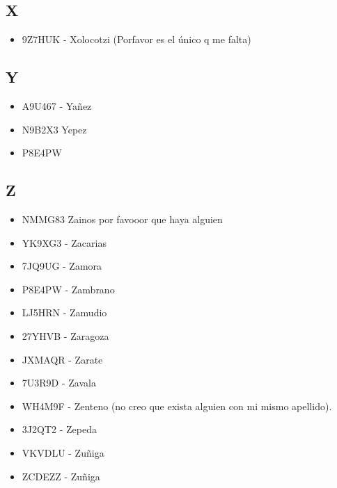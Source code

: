 \subsection*{X}
\begin{itemize}[leftmargin=*,nosep]
\item 9Z7HUK - Xolocotzi (Porfavor es el único q me falta)
\end{itemize}

\subsection*{Y}
\begin{itemize}[leftmargin=*,nosep]
\item A9U467 - Yañez
\item N9B2X3 Yepez
\item P8E4PW
\end{itemize}

\subsection*{Z}
\begin{itemize}[leftmargin=*,nosep]
\item NMMG83 Zainos por favooor que haya alguien
\item YK9XG3 - Zacarias
\item 7JQ9UG - Zamora
\item P8E4PW - Zambrano
\item LJ5HRN  -  Zamudio
\item 27YHVB  -  Zaragoza
\item JXMAQR - Zarate
\item 7U3R9D - Zavala
\item WH4M9F - Zenteno (no creo que exista alguien con mi mismo apellido).
\item 3J2QT2  -  Zepeda
\item VKVDLU  -  Zuñiga
\item ZCDEZZ - Zuñiga
\end{itemize}